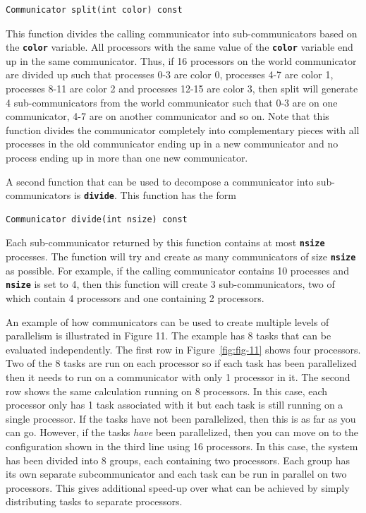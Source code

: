 \documentclass[12pt]{report} %
\begin{document}
{
\color{red}
\begin{Verbatim}[fontseries=b]
Communicator split(int color) const
\end{Verbatim}
}

This function divides the calling communicator into sub-communicators based on the \texttt{\textbf{color}} variable. All processors with the same value of the \texttt{\textbf{color}} variable end up in the same communicator. Thus, if 16 processors on the world communicator are divided up such that processes 0-3 are color 0, processes 4-7 are color 1, processes 8-11 are color 2 and processes 12-15 are color 3, then split will generate 4 sub-communicators from the world communicator such that 0-3 are on one communicator, 4-7 are on another communicator and so on. Note that this function divides the communicator completely into complementary pieces with all processes in the old communicator ending up in a new communicator and no process ending up in more than one new communicator.

A second function that can be used to decompose a communicator into sub-communicators is \texttt{\textbf{divide}}. This function has the form

{
\color{red}
\begin{Verbatim}[fontseries=b]
Communicator divide(int nsize) const
\end{Verbatim}
}

Each sub-communicator returned by this function contains at most \texttt{\textbf{nsize}} processes. The function will try and create as many communicators of size \texttt{\textbf{nsize}} as possible. For example, if the calling communicator contains 10 processes and \texttt{\textbf{nsize}} is set to 4, then this function will create 3 sub-communicators, two of which contain 4 processors and one containing 2 processors.

An example of how communicators can be used to create multiple levels of parallelism is illustrated in Figure 11. The example has 8 tasks that can be evaluated independently. The first row in Figure~\ref{fig:fig-11} shows four processors. Two of the 8 tasks are run on each processor so if each task has been parallelized then it needs to run on a communicator with only 1 processor in it. The second row shows the same calculation running on 8 processors. In this case, each processor only has 1 task associated with it but each task is still running on a single processor. If the tasks have not been parallelized, then this is as far as you can go. However, if the tasks \textit{have} been parallelized, then you can move on to the configuration shown in the third line using 16 processors. In this case, the system has been divided into 8 groups, each containing two processors. Each group has its own separate subcommunicator and each task can be run in parallel on two processors. This gives additional speed-up over what can be achieved by simply distributing tasks to separate processors.
\end{document}
